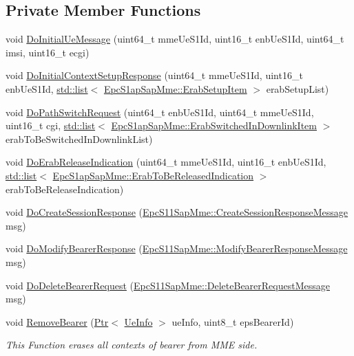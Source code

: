 \subsection*{Private Member Functions}
\begin{DoxyCompactItemize}
\item 
void \hyperlink{classns3_1_1EpcMme_adfc6d15c4d0c03951e554a90ae3b7bb2}{Do\+Initial\+Ue\+Message} (uint64\+\_\+t mme\+Ue\+S1\+Id, uint16\+\_\+t enb\+Ue\+S1\+Id, uint64\+\_\+t imsi, uint16\+\_\+t ecgi)
\item 
void \hyperlink{classns3_1_1EpcMme_a088c508d3a951fa612b21ab5479c2f64}{Do\+Initial\+Context\+Setup\+Response} (uint64\+\_\+t mme\+Ue\+S1\+Id, uint16\+\_\+t enb\+Ue\+S1\+Id, \hyperlink{openflow-interface_8h_afd9bcfa176617760671b67580f536fa7}{std\+::list}$<$ \hyperlink{structns3_1_1EpcS1apSap_1_1ErabSetupItem}{Epc\+S1ap\+Sap\+Mme\+::\+Erab\+Setup\+Item} $>$ erab\+Setup\+List)
\item 
void \hyperlink{classns3_1_1EpcMme_a21aeda4285b1e5ab9738adbd74cbd87c}{Do\+Path\+Switch\+Request} (uint64\+\_\+t enb\+Ue\+S1\+Id, uint64\+\_\+t mme\+Ue\+S1\+Id, uint16\+\_\+t cgi, \hyperlink{openflow-interface_8h_afd9bcfa176617760671b67580f536fa7}{std\+::list}$<$ \hyperlink{structns3_1_1EpcS1apSap_1_1ErabSwitchedInDownlinkItem}{Epc\+S1ap\+Sap\+Mme\+::\+Erab\+Switched\+In\+Downlink\+Item} $>$ erab\+To\+Be\+Switched\+In\+Downlink\+List)
\item 
void \hyperlink{classns3_1_1EpcMme_a36256df166278525367a051aa1392986}{Do\+Erab\+Release\+Indication} (uint64\+\_\+t mme\+Ue\+S1\+Id, uint16\+\_\+t enb\+Ue\+S1\+Id, \hyperlink{openflow-interface_8h_afd9bcfa176617760671b67580f536fa7}{std\+::list}$<$ \hyperlink{structns3_1_1EpcS1apSap_1_1ErabToBeReleasedIndication}{Epc\+S1ap\+Sap\+Mme\+::\+Erab\+To\+Be\+Released\+Indication} $>$ erab\+To\+Be\+Release\+Indication)
\item 
void \hyperlink{classns3_1_1EpcMme_a859726a0529099c9abbcaa30159093ca}{Do\+Create\+Session\+Response} (\hyperlink{structns3_1_1EpcS11SapMme_1_1CreateSessionResponseMessage}{Epc\+S11\+Sap\+Mme\+::\+Create\+Session\+Response\+Message} msg)
\item 
void \hyperlink{classns3_1_1EpcMme_a215a68f983550018e02f2356a0772208}{Do\+Modify\+Bearer\+Response} (\hyperlink{structns3_1_1EpcS11SapMme_1_1ModifyBearerResponseMessage}{Epc\+S11\+Sap\+Mme\+::\+Modify\+Bearer\+Response\+Message} msg)
\item 
void \hyperlink{classns3_1_1EpcMme_ae2d4e0ec43a0f8b1c2a0d148194df018}{Do\+Delete\+Bearer\+Request} (\hyperlink{structns3_1_1EpcS11SapMme_1_1DeleteBearerRequestMessage}{Epc\+S11\+Sap\+Mme\+::\+Delete\+Bearer\+Request\+Message} msg)
\item 
void \hyperlink{classns3_1_1EpcMme_a31f5cf4e6a96d623cad65525c8bddf9a}{Remove\+Bearer} (\hyperlink{classns3_1_1Ptr}{Ptr}$<$ \hyperlink{structns3_1_1EpcMme_1_1UeInfo}{Ue\+Info} $>$ ue\+Info, uint8\+\_\+t eps\+Bearer\+Id)
\begin{DoxyCompactList}\small\item\em This Function erases all contexts of bearer from M\+ME side. \end{DoxyCompactList}\end{DoxyCompactItemize}
